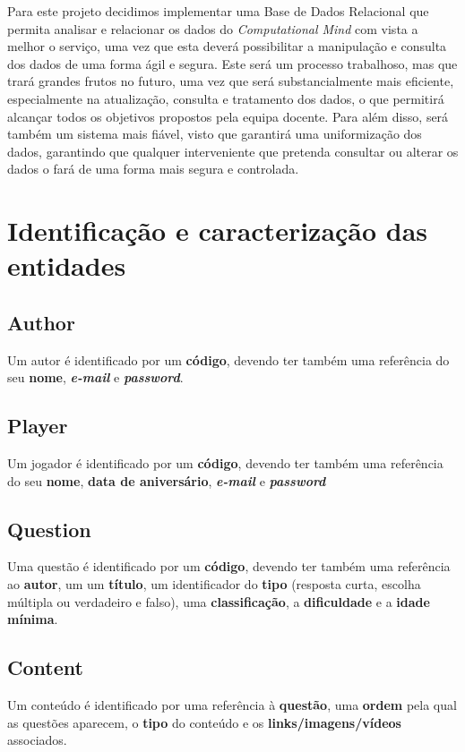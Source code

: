\documentclass[11pt,a4paper]{report}
\begin{document}
Para este projeto decidimos implementar uma Base de Dados Relacional que permita analisar e relacionar os dados do \emph{Computational Mind} com vista a melhor o serviço, uma vez que esta deverá possibilitar a manipulação e consulta dos dados de uma forma ágil e segura. 
Este será um processo trabalhoso, mas que trará grandes frutos no futuro, uma vez que será substancialmente mais eficiente, especialmente na atualização, consulta e tratamento dos dados, o que permitirá alcançar todos os objetivos propostos pela equipa docente. Para além disso, será também um sistema mais fiável, visto que garantirá uma uniformização dos dados, garantindo que qualquer interveniente que pretenda consultar ou alterar os dados o fará de uma forma mais segura e controlada.

\section{Identificação e caracterização das entidades}

\subsection{Author}
Um autor é identificado por um \textbf{código}, devendo ter também uma referência do seu \textbf{nome}, \textbf{\emph{e-mail}} e \textbf{\emph{password}}.

\subsection{Player}
Um jogador é identificado por um \textbf{código}, devendo ter também uma referência do seu \textbf{nome}, \textbf{data de aniversário}, \textbf{\emph{e-mail}} e \textbf{\emph{password}}

\subsection{Question}
Uma questão é identificado por um \textbf{código}, devendo ter também uma referência ao \textbf{autor}, um um \textbf{título}, um identificador do \textbf{tipo} (resposta curta, escolha múltipla ou verdadeiro e falso), uma \textbf{classificação}, a \textbf{dificuldade} e a \textbf{idade mínima}.

\subsection{Content}
Um conteúdo é identificado por uma referência à \textbf{questão}, uma \textbf{ordem} pela qual as questões aparecem, o \textbf{tipo} do conteúdo e os \textbf{links/imagens/vídeos} associados. 
\end{document}
